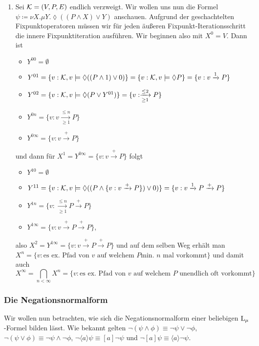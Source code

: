 \begin{example}
\begin{enumerate}
	\item Sei $\mathcal{K}=(V,P,E)$ endlich verzweigt. Wir wollen uns nun die Formel $\psi\coloneqq \nu X . \mu Y.\lozenge((P\land X) \lor Y)$ anschauen. Aufgrund der geschachtelten Fixpunktoperatoren müssen wir für jeden äußeren Fixpunkt-Iterationsschritt die innere Fixpunktiteration ausführen. Wir beginnen also mit $X^0=V$.
	Dann ist
	\begin{itemize}
		\item $Y^{00}=\emptyset$
		\item $Y^{01}=\{v : \mathcal{K},v\models \lozenge((P\land 1) \lor 0)\}=\{v : \mathcal{K},v\models \lozenge P\}=\{v : v\xrightarrow{1} P\}$
		\item $Y^{02}=\{v : \mathcal{K},v\models \lozenge(P \lor Y^{01})\}=\{v : \xrightarrow[\geq 1]{\leq 2}P\}$
		\item $Y^{0n}=\{v : v \xrightarrow[\geq 1]{\leq n} P\}$
		\item $Y^{0\infty}=\{v : v\xrightarrow{+}P\}$
	\end{itemize}
	und dann für $X^1 = Y^{0\infty} = \{v : v\xrightarrow{+}P\}$ folgt
	\begin{itemize}
		\item $Y^{10}=\emptyset$
		\item $Y^{11}=\{v : \mathcal{K},v\models \lozenge((P\land \{v : v\xrightarrow{+}P\}) \lor 0)\}=\{v : v\xrightarrow{1}P\xrightarrow{+}P\}$
		\item $Y^{1n}=\{v : \xrightarrow[\geq 1]{\leq n}P\xrightarrow{+}P\}$
		\item $Y^{1\infty}=\{v : v\xrightarrow{+}P\xrightarrow{+}P\}$,
	\end{itemize}
	also $X^2 = Y^{1\infty}=\{v : v\xrightarrow{+}P\xrightarrow{+}P\}$ und auf dem selben Weg erhält man $X^n=\{v : \text{es ex. Pfad von } v \text{ auf welchem } P \text{min. } n \text{ mal vorkommt}\}$ und damit auch $$X^\infty = \bigcap_{n<\infty}X^n=\{v : \text{es ex. Pfad von } v \text{ auf welchem } P \text{ unendlich oft vorkommt}\}$$
\end{enumerate}
\end{example}

\subsubsection*{Die Negationsnormalform}

Wir wollen nun betrachten, wie sich die Negationsnormalform einer beliebigen $\operatorname{L}_\mu$-Formel bilden lässt. Wie bekannt gelten $\neg(\psi\land\phi)\equiv \neg\psi \lor \neg\phi$, $\neg(\psi\lor\phi) \equiv \neg\psi\land\neg\phi$, $\neg\langle a \rangle\psi \equiv [a]\neg\psi$ und $\neg[a]\psi \equiv \langle a \rangle \neg\psi$.

